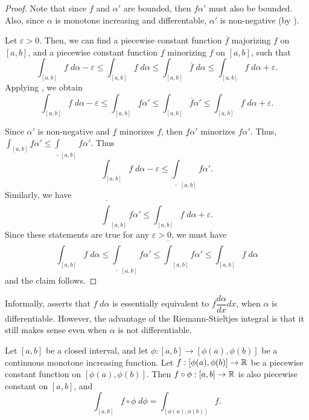 \begin{proof}
  Note that since \(f\) and \(\alpha'\) are bounded, then \(f \alpha'\) must also be bounded.
  Also, since \(\alpha\) is monotone increasing and differentable, \(\alpha'\) is non-negative (by ).

  Let \(\varepsilon > 0\).
  Then, we can find a piecewise constant function \(\overline{f}\) majorizing \(f\) on \([a, b]\), and a piecewise constant function \(\underline{f}\) minorizing \(f\) on \([a, b]\), such that
  \[
    \int_{[a, b]} f \; d \alpha - \varepsilon \leq \int_{[a, b]} \underline{f} \; d \alpha \leq \int_{[a, b]} \overline{f} \; d \alpha \leq \int_{[a, b]} f \; d \alpha + \varepsilon.
  \]
  Applying , we obtain
  \[
    \int_{[a, b]} f \; d \alpha - \varepsilon \leq \int_{[a, b]} \underline{f} \alpha' \leq \int_{[a, b]} \overline{f} \alpha' \leq \int_{[a, b]} f \; d \alpha + \varepsilon.
  \]

  Since \(\alpha'\) is non-negative and \(\underline{f}\) minorizes \(f\), then \(\underline{f} \alpha'\) minorizes \(f \alpha'\).
  Thus, \(\int_{[a, b]} \underline{f} \alpha' \leq \underline{\int}_{[a, b]} f \alpha'\).
  Thus
  \[
    \int_{[a, b]} f \; d \alpha - \varepsilon \leq \underline{\int}_{[a, b]} f \alpha'.
  \]
  Similarly, we have
  \[
    \overline{\int}_{[a, b]} f \alpha' \leq \int_{[a, b]} f \; d \alpha + \varepsilon.
  \]
  Since these statements are true for any \(\varepsilon > 0\), we must have
  \[
    \int_{[a, b]} f \; d \alpha \leq \underline{\int}_{[a, b]} f \alpha' \leq \overline{\int}_{[a, b]} f \alpha' \leq \int_{[a, b]} f \; d \alpha
  \]
  and the claim follows.
\end{proof}

\begin{rmk}\label{i:11.10.4}
  Informally,  asserts that \(f \; d \alpha\) is essentially equivalent to \(f \dfrac{d \alpha}{dx} dx\), when \(\alpha\) is differentiable.
  However, the advantage of the Riemann-Stieltjes integral is that it still makes sense even when \(\alpha\) is not differentiable.
\end{rmk}

\begin{lem}\label{i:11.10.5}
  Let \([a, b]\) be a closed interval, and let \(\phi : [a, b] \to [\phi(a), \phi(b)]\) be a continuous monotone increasing function.
  Let \(f : [\phi(a), \phi(b)] \to \mathbb{R}\) be a piecewise constant function on \([\phi(a), \phi(b)]\).
  Then \(f \circ \phi : [a, b] \to \mathbb{R}\) is also piecewise constant on \([a, b]\), and
  \[
    \int_{[a, b]} f \circ \phi \; d \phi = \int_{[\phi(a), \phi(b)]} f.
  \]
\end{lem}

